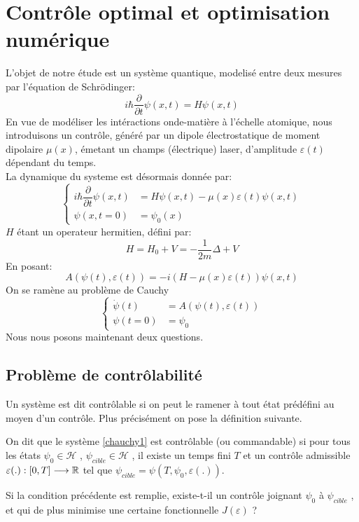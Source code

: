 \section*{Contrôle optimal et optimisation numérique}
L'objet de notre étude est un système quantique, modelisé entre deux mesures par l'équation de Schrödinger:
\begin{equation} \label{schrodinger}
i \hbar \dfrac{\partial }{\partial t} \psi (x,t) = H\psi (x,t)
\end{equation}
En vue de modéliser les intéractions onde-matière à l'échelle atomique, nous introduisons un contrôle, généré par un dipole électrostatique de moment dipolaire $\mu (x)$, émetant un champs (électrique) laser, d'amplitude $\varepsilon (t)$ dépendant du temps.\\
La dynamique du systeme est désormais donnée par:
\begin{equation} \label{eq1}
\begin{cases}
i \hbar \dfrac{\partial }{\partial t} \psi (x,t) &= H\psi (x,t)-\mu(x)\varepsilon(t)\psi (x,t) \\
\psi (x,t=0) &= \psi_0(x)
\end{cases}
\end{equation}
$H$ étant un operateur hermitien, défini par:
$$
H = H_0 + V = -\dfrac{1}{2m} \varDelta + V
$$
En posant:
\begin{equation}
A(\psi(t),\varepsilon(t))= -i(H-\mu(x)\varepsilon(t))\psi (x,t)
\end{equation}
On se ramène au problème de Cauchy
\begin{equation} \label{chauchy1}
\begin{cases}
\dot{\psi}(t) &= A(\psi(t),\varepsilon(t))\\
\psi (t=0) &= \psi_0
\end{cases}
\end{equation}
Nous nous posons maintenant deux questions.
\subsection*{Problème de contrôlabilité}
Un système est dit contrôlable si on peut le ramener à tout état prédéfini au moyen d’un contrôle. Plus précisément on pose la définition suivante.
\begin{dfn}
On dit que le système \eqref{chauchy1} est contrôlable (ou commandable) si pour tous les états $\psi_0 \in \mathcal{H}$ , $\psi_{cible} \in \mathcal{H}$ , il existe un temps fini $T$ et un contrôle admissible $\varepsilon(.) : [0, T] \longrightarrow \mathbb R$ tel que $\psi_{cible} = \psi(T, \psi_0, \varepsilon(.))$.
\end{dfn}
Si la condition précédente est remplie, existe-t-il un contrôle joignant $\psi_0$ à $\psi_{cible}$ , et qui de plus
minimise une certaine fonctionnelle $J(\varepsilon)$ ?
